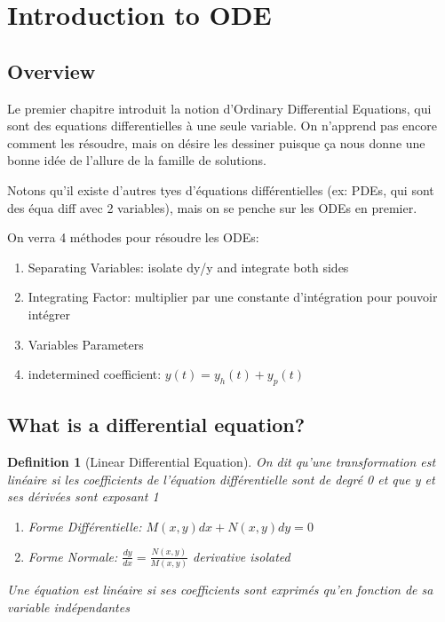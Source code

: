 \documentclass{article}
\begin{document}
\newtheorem{definition}{Definition}[subsection]
\newtheorem{theorem}{Theorem}[subsection]
\newtheorem{corollary}{Corollary}[subsection]
\newtheorem{lemma}[theorem]{Lemma}
\newtheorem{proposition}{Proposition}[section]
\newtheorem{axiom}{Axiome}
\newtheorem{property}{Propriété}[subsection]
\newtheorem*{remark}{Remarque}
\newtheorem*{problem}{Problème}
\newtheorem*{intuition}{Intuition}

\pagebreak

\section{Introduction to ODE}
\subsection*{Overview}

Le premier chapitre introduit la notion d'Ordinary Differential Equations,
qui sont des equations differentielles à une seule variable. On
n'apprend pas encore comment les résoudre, mais on désire les dessiner
puisque ça nous donne une bonne idée de l'allure de la famille de solutions.

Notons qu'il existe d'autres tyes d'équations différentielles (ex:
PDEs, qui sont des équa diff avec 2 variables), mais on se penche sur les
ODEs en premier.

On verra 4 méthodes pour résoudre les ODEs:
\begin{enumerate}
    \item Separating Variables: isolate dy/y and integrate both sides
    \item Integrating Factor: multiplier par une constante d'intégration
	pour pouvoir intégrer
    \item Variables Parameters
    \item indetermined coefficient: $ y(t) = y_h(t) + y_p(t) $

\end{enumerate}

\subsection{What is a differential equation? }

\begin{definition}[Linear Differential Equation]
    On dit qu'une transformation est linéaire si les coefficients de
    l'équation différentielle sont de degré 0 et que y et ses dérivées
    sont exposant 1
    \begin{enumerate}
	\item Forme Différentielle: $ M(x,y) dx + N(x,y) dy = 0$
	\item Forme Normale: $ \frac{dy}{dx} = \frac{N(x,y)}{M(x,y)} $
	    derivative isolated
    \end{enumerate}
    Une équation est linéaire si ses coefficients sont exprimés qu'en
    fonction de sa variable indépendantes
\end{definition}
\end{document}

